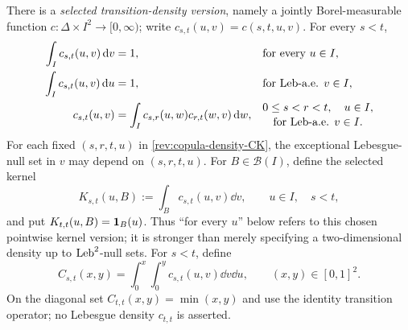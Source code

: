 \begin{assumption}
\label{rev:ass-copula-density}
There is a \emph{selected transition-density version}, namely a jointly
Borel-measurable function
$c:\Delta\times I^2\to[0,\infty)$; write
$c_{s,t}(u,v)=c(s,t,u,v)$.  For every $s<t$,
\begin{align}
\int_I c_{s,t}(u,v)\,\mathrm d v&=1,
&&\text{for every }u\in I,\notag\\
\int_I c_{s,t}(u,v)\,\mathrm d u&=1,
&&\text{for $\operatorname{Leb}$-a.e. }v\in I,
\label{rev:copula-density-margins}\\
c_{s,t}(u,v)&=\int_Ic_{s,r}(u,w)c_{r,t}(w,v)\,\mathrm d w,
&&\begin{gathered}
0\le s<r<t,\quad u\in I,\\[-2pt]
\text{for $\operatorname{Leb}$-a.e. }v\in I.
\end{gathered}
\label{rev:copula-density-CK}
\end{align}
For each fixed $(s,r,t,u)$ in \eqref{rev:copula-density-CK}, the exceptional
Lebesgue-null set in $v$ may depend on $(s,r,t,u)$.  For $B\in\mathcal B(I)$,
define the selected kernel
\begin{equation}
K_{s,t}(u,B):=\int_Bc_{s,t}(u,v)\dd v,
\qquad u\in I,\quad s<t,
\label{rev:selected-copula-kernel}
\end{equation}
and put $K_{t,t}(u,B)=\mathbf 1_B(u)$.  Thus ``for every $u$'' below refers to this
chosen pointwise kernel version; it is stronger than merely specifying a
two-dimensional density up to $\operatorname{Leb}^2$-null sets.
For $s<t$, define
\begin{equation}
C_{s,t}(x,y)=\int_0^x\int_0^y c_{s,t}(u,v)\dd v\dd u,
\qquad (x,y)\in[0,1]^2.
\label{rev:copula-from-density}
\end{equation}
On the diagonal set $C_{t,t}(x,y)=\min(x,y)$ and use the identity transition
operator; no Lebesgue density $c_{t,t}$ is asserted.
\end{assumption}

